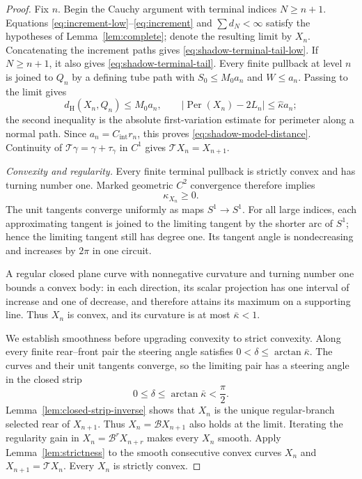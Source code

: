 \documentclass[11pt]{article}
\theoremstyle{remark}
\newcommand{\Tmap}{\mathcal T}
\newcommand{\Bmap}{\mathcal B}
\newcommand{\Per}{\operatorname{Per}}
\begin{document}
\begin{proof}
Fix \(n\).  Begin the Cauchy argument with terminal indices
\(N\geq n+1\).  Equations \eqref{eq:increment-low}--\eqref{eq:increment} and
\(\sum d_N<\infty\) satisfy the hypotheses of Lemma~\ref{lem:complete};
denote the resulting limit by \(X_n\).  Concatenating the increment paths
gives \eqref{eq:shadow-terminal-tail-low}.  If \(N\geq n+1\), it also
gives \eqref{eq:shadow-terminal-tail}.  Every finite pullback at level \(n\)
is joined to \(Q_n\) by a defining tube path with
\(S_0\leq M_0a_n\) and \(W\leq a_n\).  Passing to the limit gives
\[
 d_{\mathrm H}(X_n,Q_n)\leq M_0a_n,
 \qquad
 |\Per(X_n)-2L_n|\leq\widehat\kappa a_n;
\]
the second inequality is the absolute first-variation estimate for
perimeter along a normal path.  Since \(a_n=C_{\mathrm{int}}r_n\), this proves
\eqref{eq:shadow-model-distance}.  Continuity of
\(\Tmap\gamma=\gamma+\tau_\gamma\) in \(C^1\) gives
\(\Tmap X_n=X_{n+1}\).

\emph{Convexity and regularity.}
Every finite terminal pullback is strictly convex and has turning number one.
Marked geometric \(C^2\) convergence therefore implies
\[
   \kappa_{X_n}\geq0.
\]
The unit tangents converge uniformly as maps \(S^1\to S^1\).  For all
large indices, each approximating tangent is joined to the limiting tangent by
the shorter arc of \(S^1\); hence the limiting tangent still has degree one.
Its tangent angle is nondecreasing and increases by \(2\pi\) in one circuit.

A regular closed plane curve with nonnegative curvature and turning number one
bounds a convex body: in each direction, its scalar projection has one interval
of increase and one of decrease, and therefore attains its maximum on a
supporting line.  Thus \(X_n\) is convex, and its
curvature is at most \(\bar\kappa<1\).

We establish smoothness before upgrading convexity to strict convexity.
Along every finite rear--front pair the steering angle satisfies
\(0<\delta\leq\arctan\bar\kappa\).  The curves and their unit tangents
converge, so the limiting pair has a steering angle in the closed strip
\[
   0\leq\delta\leq\arctan\bar\kappa<\frac\pi2.
\]
Lemma~\ref{lem:closed-strip-inverse} shows that \(X_n\) is the unique
regular-branch selected rear of \(X_{n+1}\).  Thus
\(X_n=\Bmap X_{n+1}\) also holds at the limit.  Iterating the regularity gain
in \(X_n=\Bmap^rX_{n+r}\) makes every \(X_n\) smooth.
Apply Lemma~\ref{lem:strictness} to the smooth consecutive convex curves
\(X_n\) and \(X_{n+1}=\Tmap X_n\).  Every \(X_n\) is strictly convex.


\end{proof}
\end{document}
